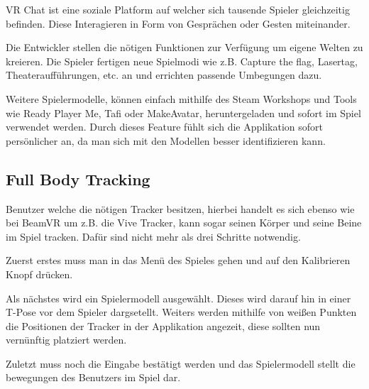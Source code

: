 VR Chat ist eine soziale Platform auf welcher sich tausende Spieler gleichzeitig befinden.
Diese Interagieren in Form von Gespr\"achen oder Gesten miteinander.

Die Entwickler stellen die n\"otigen Funktionen zur Verf\"ugung um eigene Welten zu kreieren. Die Spieler fertigen neue Spielmodi wie z.B. Capture the flag, Lasertag, Theaterauff\"uhrungen, etc. an und errichten passende Umbegungen dazu.

Weitere Spielermodelle, k\"onnen einfach mithilfe des Steam Workshops und Tools wie Ready Player Me, Tafi oder MakeAvatar, heruntergeladen und sofort im Spiel verwendet werden.
Durch dieses Feature f\"uhlt sich die Applikation sofort pers\"onlicher an, da man sich mit den Modellen besser identifizieren kann.
~\cite{VRChat_2021_AvatarCreator}

\subsection{Full Body Tracking}
\label{sec:vrchat_fullbodytracking}
Benutzer welche die n\"otigen Tracker besitzen, hierbei handelt es sich ebenso wie bei BeamVR um z.B. die Vive Tracker, kann sogar seinen K\"orper und seine Beine im Spiel tracken.
Dafür sind nicht mehr als drei Schritte notwendig.


Zuerst erstes muss man in das Men\"u des Spieles gehen und auf den Kalibrieren Knopf dr\"ucken.

Als n\"achstes wird ein Spielermodell ausgew\"ahlt.
Dieses wird darauf hin in einer T-Pose vor dem Spieler dargsetellt.
Weiters werden mithilfe von weißen Punkten die Positionen der Tracker in der Applikation angezeit, diese sollten nun vern\"unftig platziert werden.

Zuletzt muss noch die Eingabe best\"atigt werden und das Spielermodell stellt die bewegungen des Benutzers im Spiel dar.
~\cite{VRChat_2021_FullBodyTracking}


